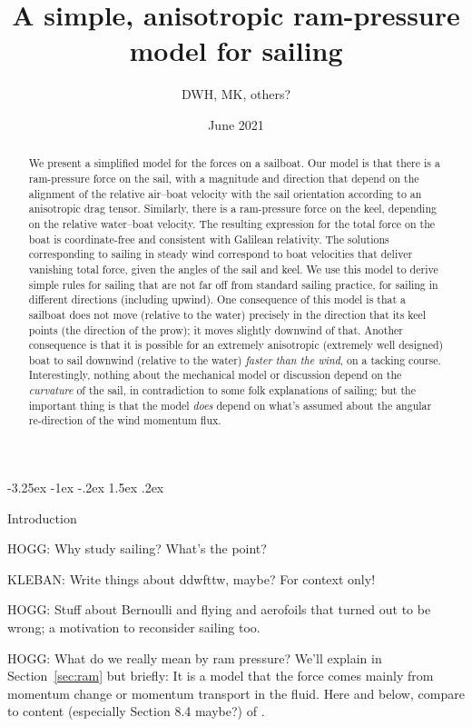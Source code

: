 \documentclass[letterpaper]{article}
\title{\bfseries%
A simple, anisotropic ram-pressure model for sailing}
\author{DWH, MK, others?}
\date{June 2021}
\makeatletter
\newcommand{\secref}[1]{Section~\ref{#1}}
\renewcommand\section{\@startsection {section}{1}{\z@}%
  {-3.25ex \@plus -1ex \@minus -.2ex}%
  {1.5ex \@plus .2ex}%
  {\raggedright\normalfont\large\bfseries}}
\makeatother
\begin{document}
\maketitle

\begin{abstract}\noindent
    We present a simplified model for the forces on a sailboat.
    Our model is that there is a ram-pressure force on the sail, with a magnitude and direction that depend on the alignment of the relative air--boat velocity with the sail orientation according to an anisotropic drag tensor.
    Similarly, there is a ram-pressure force on the keel, depending on the relative water--boat velocity.
    The resulting expression for the total force on the boat is coordinate-free and consistent with Galilean relativity.
    The solutions corresponding to sailing in steady wind correspond to boat velocities that deliver vanishing total force, given the angles of the sail and keel.
    We use this model to derive simple rules for sailing that are not far off from standard sailing practice, for sailing in different directions (including upwind).
    One consequence of this model is that a sailboat does not move (relative to the water) precisely in the direction that its keel points (the direction of the prow); it moves slightly downwind of that.
    Another consequence is that it is possible for an extremely anisotropic (extremely well designed) boat to sail downwind (relative to the water) \emph{faster than the wind}, on a tacking course.
    Interestingly, nothing about the mechanical model or discussion depend on the \emph{curvature} of the sail, in contradiction to some folk explanations of sailing; but the important thing is that the model \emph{does} depend on what's assumed about the angular re-direction of the wind momentum flux.
\end{abstract}

\section{Introduction}\label{sec:intro}

HOGG: Why study sailing? What's the point?

KLEBAN: Write things about ddwfttw, maybe? For context only!

HOGG: Stuff about Bernoulli and flying and aerofoils that turned out to be wrong; a motivation to reconsider sailing too.

HOGG: What do we really mean by ram pressure?
We'll explain in \secref{sec:ram} but briefly:
It is a model that the force comes mainly from momentum change or momentum transport in the fluid. Here and below, compare to content (especially Section 8.4 maybe?) of \cite{symmetry}.
\end{document}
